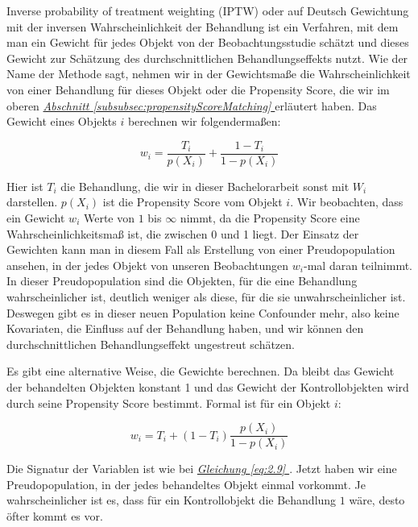 \documentclass[12pt,a4paper,twoside]{scrartcl}
\numberwithin{equation}{section}
\newcommand{\refsec}[1]{\emph{\hyperref[#1]{Abschnitt \ref*{#1} }}}
\renewcommand*{\refeq}[1]{\emph{\hyperref[#1]{Gleichung \ref*{#1} }}}
\begin{document}
Inverse probability of treatment weighting (IPTW) oder auf Deutsch Gewichtung mit der inversen Wahrscheinlichkeit der Behandlung ist ein Verfahren, mit dem man ein Gewicht für jedes Objekt von der Beobachtungsstudie schätzt und dieses Gewicht zur Schätzung des durchschnittlichen Behandlungseffekts nutzt. Wie der Name der Methode sagt, nehmen wir in der Gewichtsmaße die Wahrscheinlichkeit von einer Behandlung für dieses Objekt oder die Propensity Score, die wir im oberen \refsec{subsubsec:propensityScoreMatching} erläutert haben. Das Gewicht eines Objekts $i$ berechnen wir folgendermaßen: \par

\begin{equation}\label{eq:2.9}
  w_i = \frac{T_i}{p(X_i)} + \frac{1-T_i}{1-p(X_i)}
\end{equation}

\noindent
Hier ist $T_i$ die Behandlung, die wir in dieser Bachelorarbeit sonst mit $W_i$ darstellen. $p(X_i)$ ist die Propensity Score vom Objekt $i$. Wir beobachten, dass ein Gewicht $w_i$ Werte von $1$ bis $\infty$ nimmt, da die Propensity Score eine Wahrscheinlichkeitsmaß ist, die zwischen 0 und 1 liegt. Der Einsatz der Gewichten kann man in diesem Fall als Erstellung von einer Preudopopulation ansehen, in der jedes Objekt von unseren Beobachtungen $w_i$-mal daran teilnimmt. In dieser Preudopopulation sind die Objekten, für die eine Behandlung wahrscheinlicher ist, deutlich weniger als diese, für die sie unwahrscheinlicher ist. Deswegen gibt es in dieser neuen Population keine Confounder mehr, also keine Kovariaten, die Einfluss auf der Behandlung haben, und wir können den durchschnittlichen Behandlungseffekt ungestreut schätzen\cite{robins2000marginal}. 
\par 

\noindent
Es gibt eine alternative Weise, die Gewichte berechnen. Da bleibt das Gewicht der behandelten Objekten konstant 1 und das Gewicht der Kontrollobjekten wird durch seine Propensity Score bestimmt. Formal ist für ein Objekt $i$:\par

\begin{equation}\label{eq:2.10}
  w_i = T_i + (1-T_i) \frac{p(X_i)}{1-p(X_i)}
\end{equation}

\noindent
Die Signatur der Variablen ist wie bei \refeq{eq:2.9}. Jetzt haben wir eine Preudopopulation, in der jedes behandeltes Objekt einmal vorkommt. Je wahrscheinlicher ist es, dass für ein Kontrollobjekt die Behandlung $1$ wäre, desto  öfter kommt es vor\cite{hirano2003efficient}.\par
\end{document}
